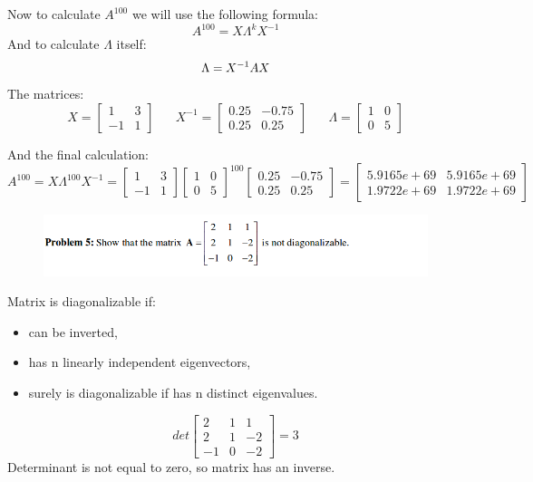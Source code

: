 \documentclass[eng,openany]{mgr}
\begin{document}
Now to calculate $A^{100}$ we will use the following formula:\\
\[
A^{100} = X \Lambda^k X^{-1}
\]
And to calculate $\Lambda$ itself:
\[
\\
\Lambda = X^{-1}AX
\]
The matrices:\[
X = 
\begin{bmatrix}
1 &3\\
-1 & 1
\end{bmatrix}
\; \; \;\; \; \;
X^{-1} = 
\begin{bmatrix}
0.25 &-0.75\\
0.25 & 0.25
\end{bmatrix}
\; \; \;\; \; \;
\Lambda =
\begin{bmatrix}
1 &0\\
0 & 5
\end{bmatrix}
\]

And the final calculation:
\[
A^{100} = X \Lambda^{100} X^{-1} = 
\begin{bmatrix}
1 &3\\
-1 & 1
\end{bmatrix}
\begin{bmatrix}
1 &0\\
0 & 5
\end{bmatrix}
^{100}
\begin{bmatrix}
0.25 &-0.75\\
0.25 & 0.25
\end{bmatrix}
=
\begin{bmatrix}
   5.9165e+69&   5.9165e+69\\
   1.9722e+69&   1.9722e+69
\end{bmatrix}
\]
\newpage
\begin{figure}[h]
\centering
\includegraphics[width=0.8\linewidth]{screenshot006}
\label{fig:screenshot006}
\end{figure}
Matrix is diagonalizable if:
\begin{itemize}
	\item can be inverted,
	\item has n linearly independent eigenvectors,
	\item surely is diagonalizable if has n distinct eigenvalues.
\end{itemize}
\[
det
\begin{bmatrix}
2 &1 &1\\
2 &1 &-2\\
-1 &0 &-2
\end{bmatrix}
= 3
\]
Determinant is not equal to zero, so matrix has an inverse.
\\
\end{document}
